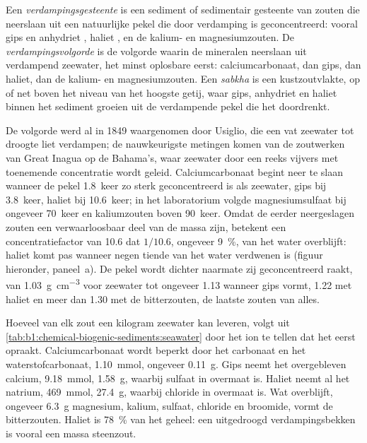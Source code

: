 \begin{definition}\label{def:b1:chemical-biogenic-sediments:evaporite}
Een \emph{verdampingsgesteente} is een sediment of sedimentair gesteente van zouten die neerslaan uit een natuurlijke pekel die door verdamping is geconcentreerd: vooral gips  en anhydriet , haliet , en de kalium- en magnesiumzouten. De \emph{verdampingsvolgorde} is de volgorde waarin de mineralen neerslaan uit verdampend zeewater, het minst oplosbare eerst: calciumcarbonaat, dan gips, dan haliet, dan de kalium- en magnesiumzouten. Een \emph{sabkha} is een kustzoutvlakte, op of net boven het niveau van het hoogste getij, waar gips, anhydriet en haliet binnen het sediment groeien uit de verdampende pekel die het doordrenkt.
\end{definition}

De volgorde werd al in 1849 waargenomen door Usiglio, die een vat zeewater tot droogte liet verdampen; de nauwkeurigste metingen komen van de zoutwerken van Great Inagua op de Bahama's, waar zeewater door een reeks vijvers met toenemende concentratie wordt geleid. Calciumcarbonaat begint neer te slaan wanneer de pekel 1.8~keer zo sterk geconcentreerd is als zeewater, gips bij 3.8~keer, haliet bij 10.6~keer; in het laboratorium volgde magnesiumsulfaat bij ongeveer 70~keer en kaliumzouten boven 90~keer. Omdat de eerder neergeslagen zouten een verwaarloosbaar deel van de massa zijn, betekent een concentratiefactor van 10.6 dat $1/10.6$, ongeveer \qty{9}{\%}, van het water overblijft: haliet komt pas wanneer negen tiende van het water verdwenen is (figuur hieronder, paneel~a).
De pekel wordt dichter naarmate zij geconcentreerd raakt, van \qty{1.03}{g.cm^{-3}} voor zeewater tot ongeveer \num{1.13} wanneer gips vormt, \num{1.22} met haliet en meer dan \num{1.30} met de bitterzouten, de laatste zouten van alles.

Hoeveel van elk zout een kilogram zeewater kan leveren, volgt uit \cref{tab:b1:chemical-biogenic-sediments:seawater} door het ion te tellen dat het eerst opraakt. Calciumcarbonaat wordt beperkt door het carbonaat en het waterstofcarbonaat, \qty{1.10}{mmol}, ongeveer \qty{0.11}{g}. Gips neemt het overgebleven calcium, \qty{9.18}{mmol}, \qty{1.58}{g}, waarbij sulfaat in overmaat is. Haliet neemt al het natrium, \qty{469}{mmol}, \qty{27.4}{g}, waarbij chloride in overmaat is. Wat overblijft, ongeveer \qty{6.3}{g} magnesium, kalium, sulfaat, chloride en broomide, vormt de bitterzouten. Haliet is \qty{78}{\%} van het geheel: een uitgedroogd verdampingsbekken is vooral een massa steenzout.

